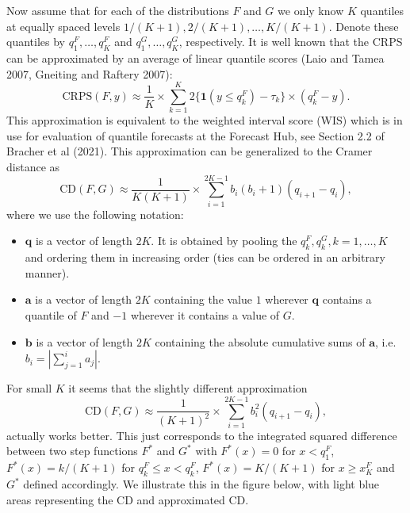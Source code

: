 \documentclass[
]{article}
\providecommand{\tightlist}{%
  \setlength{\itemsep}{0pt}\setlength{\parskip}{0pt}}
\begin{document}
Now assume that for each of the distributions \(F\) and \(G\) we only
know \(K\) quantiles at equally spaced levels
\(1/(K + 1), 2/(K + 1), \dots, K/(K + 1)\). Denote these quantiles by
\(q^F_1, \dots, q^F_K\) and \(q^G_1, \dots, q^G_K\), respectively. It is
well known that the CRPS can be approximated by an average of linear
quantile scores (Laio and Tamea 2007, Gneiting and Raftery 2007):
\begin{equation}
\text{CRPS}(F, y) \approx \frac{1}{K} \times \sum_{k = 1}^K 2\{\mathbf{1}(y \leq q^F_k)-\tau_k\} \times (q^F_k - y).\label{eq:linear_quantile_scores}
\end{equation} This approximation is equivalent to the weighted interval
score (WIS) which is in use for evaluation of quantile forecasts at the
Forecast Hub, see Section 2.2 of Bracher et al (2021). This
approximation can be generalized to the Cramer distance as
\begin{equation}
\text{CD}(F, G) \approx \frac{1}{K(K + 1)} \times \sum_{i = 1}^{2K - 1} b_i(b_i + 1)(q_{i + 1} - q_i),\label{eq:approx1}
\end{equation} where we use the following notation:

\begin{itemize}
\tightlist
\item
  \(\mathbf{q}\) is a vector of length \(2K\). It is obtained by pooling
  the \(q^F_k, q^G_k, k = 1, \dots, K\) and ordering them in increasing
  order (ties can be ordered in an arbitrary manner).
\item
  \(\mathbf{a}\) is a vector of length \(2K\) containing the value \(1\)
  wherever \(\mathbf{q}\) contains a quantile of \(F\) and \(-1\)
  wherever it contains a value of \(G\).
\item
  \(\mathbf{b}\) is a vector of length \(2K\) containing the absolute
  cumulative sums of \(\mathbf{a}\),
  i.e.~\(b_i = \left|\sum_{j = 1}^i a_j\right|\).
\end{itemize}

For small \(K\) it seems that the slightly different approximation
\begin{equation}
\text{CD}(F, G) \approx \frac{1}{(K + 1)^2} \times \sum_{i = 1}^{2K - 1} b_i^2(q_{i + 1} - q_i),\label{eq:approx2}
\end{equation} actually works better. This just corresponds to the
integrated squared difference between two step functions \(F^*\) and
\(G^*\) with \(F^*(x) = 0\) for \(x < q^F_1\), \(F^*(x) = k/(K + 1)\)
for \(q^F_k \leq x < q^F_k\), \(F^*(x) = K/(K + 1)\) for
\(x \geq x^F_K\) and \(G^*\) defined accordingly. We illustrate this in
the figure below, with light blue areas representing the CD and
approximated CD.
\end{document}

